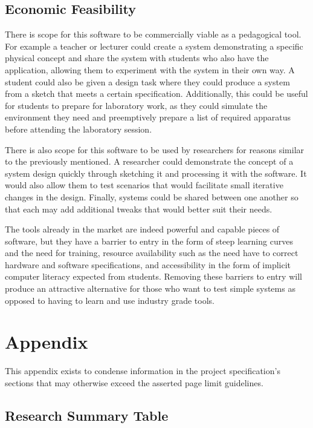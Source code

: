 \documentclass{article}
\begin{document}
\subsection{Economic Feasibility}
\label{subsec:Economic Feasibility}

There is scope for this software to be commercially viable as a pedagogical tool. For example a teacher or lecturer
could create a system demonstrating a specific physical concept and
share the system with students who also have the application, allowing them to experiment with the system in their 
own way. A student could also be given a design task where they could produce a system from a sketch that meets a 
certain specification. Additionally, this could be useful for students to prepare for laboratory work, as they could
simulate the environment they need and preemptively prepare a list of required apparatus before attending the laboratory
session.

There is also scope for this software to be used by researchers for reasons similar to the previously mentioned. A 
researcher could demonstrate the concept of a system design quickly through sketching it and processing it with the 
software. It would also allow them to test scenarios that would facilitate small iterative changes in the design. Finally, 
systems could be shared between one another so that each may add additional tweaks that would better suit their needs.

The tools already in the market are indeed powerful and capable pieces of software, but they have a barrier to entry
in the form of steep learning curves and the need for training, resource availability such as the need have to correct
hardware and software specifications, and accessibility in the form of implicit computer literacy expected from students.
Removing these barriers to entry will produce an attractive alternative for those who want to test simple systems as 
opposed to having to learn and use industry grade tools. 

\pagebreak

\appendix
{}
\section{Appendix}
\label{sec:Appendix}

This appendix exists to condense information in the project specification's sections that may otherwise exceed the 
asserted page limit guidelines. 

\subsection{Research Summary Table}
\label{subsec:Research Summary Table}
\end{document}
